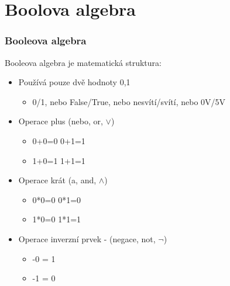 \documentclass{beamer}
\begin{document}
\section{Boolova algebra}



\begin{frame}
\frametitle{Booleova algebra}

Booleova algebra je matematická struktura:
\begin{itemize}
\item Používá pouze dvě hodnoty 0,1
\begin{itemize}
\item 0/1, nebo False/True, nebo nesvítí/svítí, nebo 0V/5V
\end{itemize}
\item Operace plus (nebo, or, $\lor$)
\begin{itemize}
\item 0+0=0 \phantom{XXXX}  0+1=1
\item 1+0=1 \phantom{XXXX}  1+1=1
\end{itemize}
\item Operace krát (a, and, $\land$)
\begin{itemize}
\item 0*0=0 \phantom{XXXX}  0*1=0
\item 1*0=0 \phantom{XXXX}  1*1=1
\end{itemize}
\item Operace inverzní prvek - (negace, not, $\neg$)
\begin{itemize}
\item -0 = 1
\item -1 = 0
\end{itemize}
\end{itemize}
\end{frame}
\end{document}
